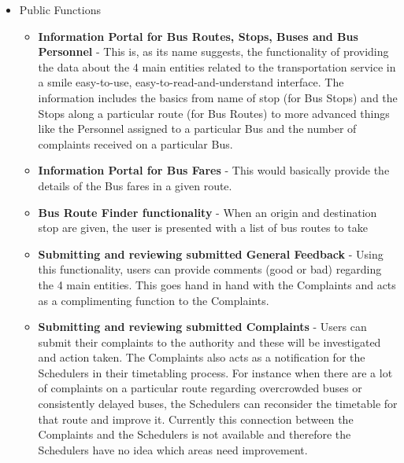 \documentclass[12pt, oneside]{report}
\begin{document}
\begin{itemize}

\item Public Functions
\begin{itemize}
\item \textbf{Information Portal for Bus Routes, Stops, Buses and Bus Personnel} - This is, as its name suggests, the functionality of providing the data about the 4 main entities related to the transportation service in a smile easy-to-use, easy-to-read-and-understand interface. The information includes the basics from name of stop (for Bus Stops) and the Stops along a particular route (for Bus Routes) to more advanced things like the Personnel assigned to a particular Bus and the number of complaints received on a particular Bus.
\item \textbf{Information Portal for Bus Fares} - This would basically provide the details of the Bus fares in a given route.
\item \textbf{Bus Route Finder functionality} - When an origin and destination stop are given, the user is presented with a list of bus routes to take
\item \textbf{Submitting and reviewing submitted General Feedback} - Using this functionality, users can provide comments (good or bad) regarding the 4 main entities. This goes hand in hand with the Complaints and acts as a complimenting function to the Complaints.
\item \textbf{Submitting and reviewing submitted Complaints} - Users can submit their complaints to the authority and these will be investigated and action taken. The Complaints also acts as a notification for the Schedulers in their timetabling process. For instance when there are a lot of complaints on a particular route regarding overcrowded buses or consistently delayed buses, the Schedulers can reconsider the timetable for that route and improve it. Currently this connection between the Complaints and the Schedulers is not available and therefore the Schedulers have no idea which areas need improvement.
\end{itemize}


\end{itemize}
\end{document}
